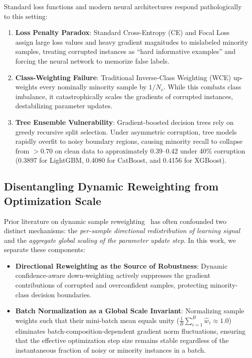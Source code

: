 \documentclass[preprint,12pt]{elsarticle}
\begin{document}
Standard loss functions and modern neural architectures respond pathologically to this setting:
\begin{enumerate}
    \item \textbf{Loss Penalty Paradox}: Standard Cross-Entropy (CE) and Focal Loss~\cite{lin2017focal} assign large loss values and heavy gradient magnitudes to mislabeled minority samples, treating corrupted instances as ``hard informative examples'' and forcing the neural network to memorize false labels.
    \item \textbf{Class-Weighting Failure}: Traditional Inverse-Class Weighting (WCE) up-weights every nominally minority sample by $1/N_c$. While this combats class imbalance, it catastrophically scales the gradients of corrupted instances, destabilizing parameter updates.
    \item \textbf{Tree Ensemble Vulnerability}: Gradient-boosted decision trees rely on greedy recursive split selection. Under asymmetric corruption, tree models rapidly overfit to noisy boundary regions, causing minority recall to collapse from $>0.70$ on clean data to approximately 0.39--0.42 under 40\% corruption (0.3897 for LightGBM, 0.4080 for CatBoost, and 0.4156 for XGBoost).
\end{enumerate}

\subsection{Disentangling Dynamic Reweighting from Optimization Scale}

Prior literature on dynamic sample reweighting~\cite{ren2018learning,kumar2010self} has often confounded two distinct mechanisms: the \emph{per-sample directional redistribution of learning signal} and the \emph{aggregate global scaling of the parameter update step}. In this work, we separate these components:
\begin{itemize}
    \item \textbf{Directional Reweighting as the Source of Robustness}: Dynamic confidence-aware down-weighting actively suppresses the gradient contributions of corrupted and overconfident samples, protecting minority-class decision boundaries.
    \item \textbf{Batch Normalization as a Global Scale Invariant}: Normalizing sample weights such that their mini-batch mean equals unity ($\frac{1}{B}\sum_{i=1}^B \hat{w}_i \approx 1.0$) eliminates batch-composition-dependent gradient norm fluctuations, ensuring that the effective optimization step size remains stable regardless of the instantaneous fraction of noisy or minority instances in a batch.
\end{itemize}
\end{document}

